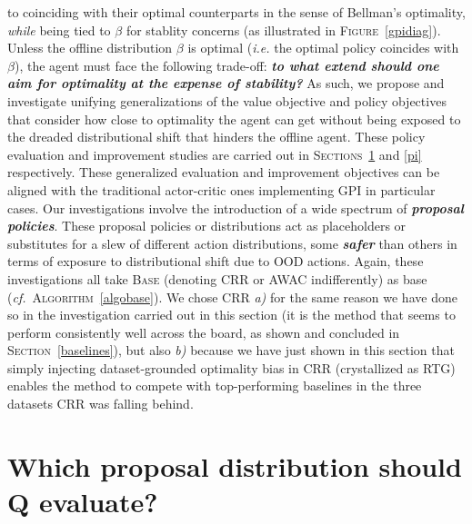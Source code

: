 to coinciding with their optimal counterparts in the sense of Bellman's optimality,
\emph{while} being tied to $\beta$ for stablity concerns
(as illustrated in \textsc{Figure}~\ref{gpidiag}).
Unless the offline distribution $\beta$ is optimal (\textit{i.e.} the optimal policy coincides with $\beta$),
the agent must face the following trade-off: \textbf{\emph{to what extend should one aim for optimality
at the expense of stability?}}
As such, we propose and investigate unifying generalizations of the value objective
and policy objectives that consider how close to optimality the agent can get
without being exposed to the dreaded distributional shift that hinders the offline agent.
These policy evaluation and improvement studies
are carried out in \textsc{Sections}~\ref{pe} and \ref{pi} respectively.
These generalized evaluation and improvement objectives
can be aligned with the traditional actor-critic ones implementing GPI
in particular cases.
Our investigations involve the introduction of a wide spectrum of \textbf{\emph{proposal policies}}.
These proposal policies or distributions
act as placeholders or substitutes for a slew of different action distributions,
some \textbf{\emph{safer}} than others in terms of exposure to distributional shift due to OOD actions.
Again, these investigations all take
\textsc{Base} (denoting CRR
or AWAC indifferently)
as base
(\textit{cf.}~\textsc{Algorithm}~\ref{algobase}).
We chose CRR
\textit{a)}
for the same reason we have done so in the investigation carried out in this section
(it is the method that seems to perform consistently well across the board,
as shown and concluded in \textsc{Section}~\ref{baselines}),
but also
\textit{b)}
because we have just shown in this section that simply injecting dataset-grounded optimality bias
in CRR (crystallized as RTG) enables the method to compete with top-performing baselines in the
three datasets CRR was falling behind.

\section{Which proposal distribution should Q evaluate?}
\label{pe}

